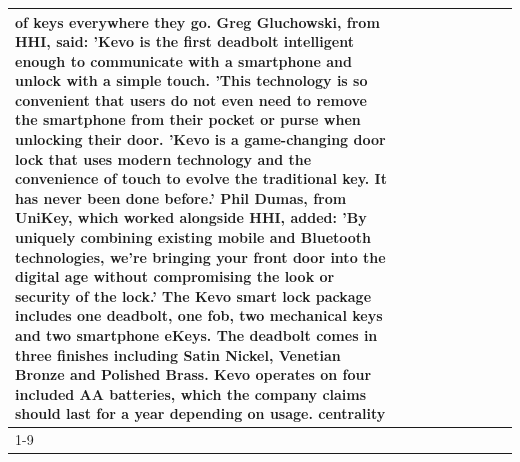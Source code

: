 \begin{table}[H]
\begin{tabular}{lllrlllll}
of keys everywhere they go. Greg Gluchowski, from HHI, said: 'Kevo is the first deadbolt intelligent enough to communicate with a smartphone and unlock with a simple touch. 'This technology is so convenient that users do not even need to remove the smartphone from their pocket or purse when unlocking their door. 'Kevo is a game-changing door lock that uses modern technology and the convenience of touch to evolve the traditional key. It has never been done before.' Phil Dumas, from UniKey, which worked alongside HHI, added: 'By uniquely combining existing mobile and Bluetooth technologies, we’re bringing your front door into the digital age without compromising the look or security of the lock.' The Kevo smart lock package includes one deadbolt, one fob, two mechanical keys and two smartphone eKeys. The deadbolt comes in three finishes including Satin Nickel, Venetian Bronze and Polished Brass. Kevo operates on four included AA batteries, which the company claims should last for a year depending on usage. centrality \\
\cline{1-9}

\end{tabular}
\end{table}
